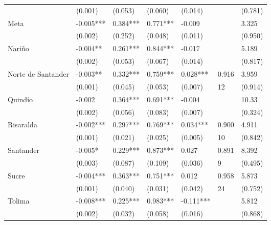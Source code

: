 \begin{table}[H]
\begin{tabular}{lllllll}
& \scriptsize{(0.001)} & \scriptsize{(0.053)} & \scriptsize{(0.060)} & \scriptsize{(0.014)} &     & \scriptsize{(0.781)} \\
\vspace{-0.3cm} Meta & -0.005*** & 	0.384*** &	0.771*** &	-0.009 &       &  3.325 \\  
& \scriptsize{(0.002)} & \scriptsize{(0.252)} & \scriptsize{(0.048)} & \scriptsize{(0.011)} &       & \scriptsize{(0.950)} \\
\vspace{-0.3cm} Nariño & -0.004** &	0.261*** &	0.844*** &	-0.017 &       & 5.189 \\   
& \scriptsize{(0.002)} & \scriptsize{(0.053)} & \scriptsize{(0.067)} & \scriptsize{(0.014)} &  & \scriptsize{(0.817)} \\
\vspace{-0.3cm} Norte de Santander & -0.003** & 0.332*** & 0.759*** & 0.028*** & 0.916 & 3.959\\   
& \scriptsize{(0.001)} & \scriptsize{(0.045)} & \scriptsize{(0.053)} & \scriptsize{(0.007)} & \scriptsize{12}    & \scriptsize{(0.914)} \\
\vspace{-0.3cm} Quindío & -0.002 & 0.364*** & 0.691*** & -0.004 &       & 10.33 \\  
& \scriptsize{(0.002)} & \scriptsize{(0.056)} & \scriptsize{(0.083)} & \scriptsize{(0.007)} &       & \scriptsize{(0.324)} \\
\vspace{-0.3cm} Risaralda & -0.002*** & 0.297*** & 0.769*** & 0.034*** & 0.900 & 4.911\\   
& \scriptsize{(0.001)} & \scriptsize{(0.021)} & \scriptsize{(0.025)} & \scriptsize{(0.005)} & \scriptsize{10}    & \scriptsize{(0.842)} \\
\vspace{-0.3cm} Santander & -0.005* & 0.229*** & 0.873*** & 0.027 & 0.891 & 8.392\\   
& \scriptsize{(0.003)} & \scriptsize{(0.087)} & \scriptsize{(0.109)} & \scriptsize{(0.036)} & \scriptsize{9}     & \scriptsize{(0.495)} \\
\vspace{-0.3cm} Sucre & -0.004*** &	0.363*** &	0.751*** &	0.012 &  0.958  & 5.873\\   
& \scriptsize{(0.001)} & \scriptsize{(0.040)} & \scriptsize{(0.031)} & \scriptsize{(0.042)} &  \scriptsize{24}  & \scriptsize{(0.752)} \\
\vspace{-0.3cm} Tolima & -0.008*** &	0.225*** &	0.983*** &	-0.111*** &  & 5.812\\   
& \scriptsize{(0.002)} & \scriptsize{(0.032)} & \scriptsize{(0.058)} & \scriptsize{(0.016)} &    & \scriptsize{(0.868)} \\
\end{tabular}
\label{tab31}\\
\raggedright  \scriptsize \
\end{table}%


